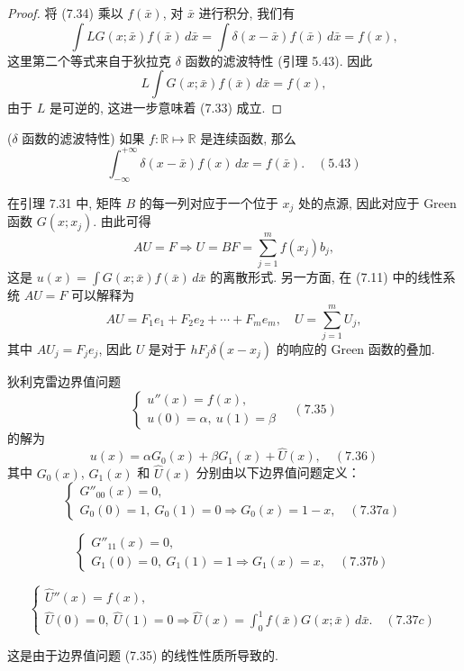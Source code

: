 \documentclass[a4paper]{ctexart}
\newcommand{\hl}[1]
{\noindent {\bf {#1}}}
\begin{document}
{\begin{proof}
将 (7.34) 乘以 $f(\bar{x})$, 对 $\bar{x}$ 进行积分, 我们有
$$
\int LG(x; \bar{x})f(\bar{x}) \, d\bar{x} 
= \int \delta(x - \bar{x})f(\bar{x}) \, d\bar{x} = f(x),
$$
这里第二个等式来自于狄拉克 $\delta$ 函数的滤波特性 (引理 5.43). 因此
$$
L \int G(x; \bar{x})f(\bar{x}) \, d\bar{x} = f(x),
$$
由于 $L$ 是可逆的, 这进一步意味着 (7.33) 成立.
\end{proof}

\hl{引理 5.43} ($\delta$ 函数的滤波特性) 如果 $f: \mathbb{R} \mapsto \mathbb{R}$ 
是连续函数, 那么
$$
\int_{-\infty}^{+\infty} \delta(x - \bar{x})f(x) \, dx = f(\bar{x}). \quad (5.43)
$$

在引理 7.31 中, 矩阵 $B$ 的每一列对应于一个位于 $x_j$ 处的点源, 
因此对应于 Green 函数 $G(x; x_j)$. 由此可得
$$
AU = F \Rightarrow U = BF = \sum_{j = 1}^{m} f(x_j) b_j,
$$
这是 $u(x) = \int G(x; \bar{x})f(\bar{x}) \, d\bar{x}$ 的离散形式. 
另一方面, 在 (7.11) 中的线性系统 $AU = F$ 可以解释为
$$
AU = F_1 e_1 + F_2 e_2 + \cdots + F_m e_m, \quad U = \sum_{j = 1}^{m} U_j,
$$
其中 $AU_j = F_je_j$, 因此 $U$ 是对于 $hF_j \delta(x - x_j)$ 的响应的 
Green 函数的叠加. 

\hl{定理 7.34} 狄利克雷边界值问题
$$
\begin{cases}
u''(x) = f(x), \\
u(0) = \alpha, \ u(1) = \beta
\end{cases} \quad (7.35)
$$
的解为
$$
u(x) = \alpha G_0(x) + \beta G_1(x) + \hat{U}(x), \quad (7.36)
$$
其中 $G_0(x)$, $G_1(x)$ 和 $\hat{U}(x)$ 分别由以下边界值问题定义：
$$
\begin{cases}
G''_{00}(x) = 0, \\
G_0(0) = 1, \ G_0(1) = 0 \Rightarrow G_0(x) = 1 - x, \quad (7.37a)
\end{cases}
$$

$$
\begin{cases}
G''_{11}(x) = 0, \\
G_1(0) = 0, \ G_1(1) = 1 \Rightarrow G_1(x) = x, \quad (7.37b)
\end{cases}
$$

$$
\begin{cases}
\hat{U}''(x) = f(x), \\
\hat{U}(0) = 0, \ \hat{U}(1) = 0 \Rightarrow \hat{U}(x) 
= \int_{0}^{1} f(\bar{x})G(x; \bar{x}) \, d\bar{x}. \quad (7.37c)
\end{cases}
$$

这是由于边界值问题 (7.35) 的线性性质所导致的.

}
\end{document}
